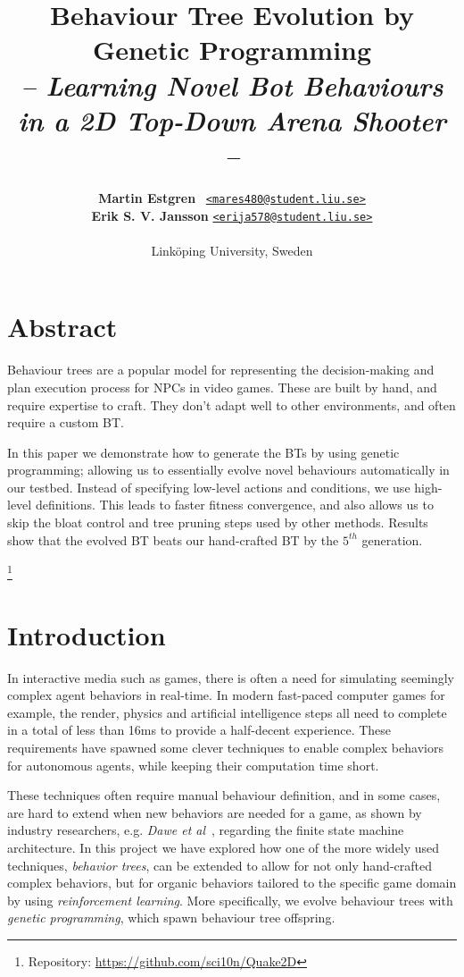 \documentclass[a4paper, twocolumn]{article}
\title{\textbf{Behaviour Tree Evolution by Genetic Programming}\\
       \Large{\emph{-- Learning Novel Bot Behaviours in a 2D Top-Down Arena Shooter --}}}
\author{{\textbf{Martin Estgren}} \;\;\;\;\;\;\;\;\;\, {\href{mailto:mares480@student.liu.se}
                                                       {\texttt{<mares480@student.liu.se>}}} \\
        {\textbf{Erik S. V. Jansson}} \;\;\;\;         {\href{mailto:erija578@student.liu.se}
                                                       {\texttt{<erija578@student.liu.se>}}} \\~\\
        {Linköping University, Sweden}\vspace{-2.0ex}}
\begin{document}
    \maketitle
    \section*{Abstract}

    Behaviour trees are a popular model for representing the decision-making and plan execution process for NPCs in video games. These are built by hand, and require expertise to craft. They don't adapt well to other environments, and often require a custom BT.

    In this paper we demonstrate how to generate the BTs by using genetic programming; allowing us to essentially evolve novel behaviours automatically in our testbed. Instead of specifying low-level actions and conditions, we use high-level definitions. This leads to faster fitness convergence, and also allows us to skip the bloat control and tree pruning steps used by other methods. Results show that the evolved BT beats our hand-crafted BT by the \(5^{th}\) generation. \footnotemark[1]

    \vspace{1.0em}

    \begingroup
    \def\addvspace#1{}
    \tableofcontents
    \endgroup
    \newpage

    \newpage %
    \nocite{*} %
    
    
    \footnote[1]{Repository: \url{https://github.com/sci10n/Quake2D}}
    \clearpage

    \section{Introduction} \label{sec:introduction}

    In interactive media such as games, there is often a need for simulating seemingly complex agent behaviors in real-time. In modern fast-paced computer games for example, the render, physics and artificial intelligence steps all need to complete in a total of less than 16ms to provide a half-decent experience. These requirements have spawned some clever techniques to enable complex behaviors for autonomous agents, while keeping their computation time short.

    These techniques often require manual behaviour definition, and in some cases, are hard to extend when new behaviors are needed for a game, as shown by industry researchers, e.g. \emph{Dawe et al}~\cite{dawe2014overview}, regarding the finite state machine architecture. In this project we have explored how one of the more widely used techniques, \emph{behavior trees}, can be extended to allow for not only hand-crafted complex behaviors, but for organic behaviors tailored to the specific game domain by using \emph{reinforcement learning}. More specifically, we evolve behaviour trees with \emph{genetic programming}, which spawn behaviour tree offspring.
\end{document}
